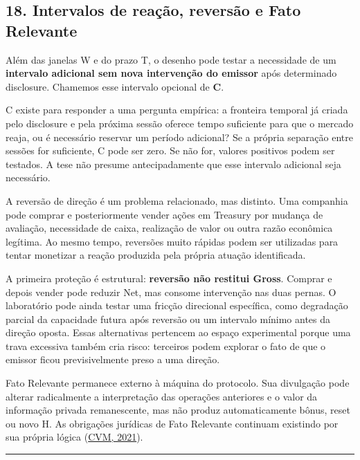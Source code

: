\documentclass[
  a4paper,
]{article}
\begin{document}
\hypertarget{18-cooldown-reversao-e-fato-relevante}{}

\hypertarget{18-intervalos-de-reauxe7uxe3o-reversuxe3o-e-fato-relevante}{%
\subsection{18. Intervalos de reação, reversão e Fato
Relevante}\label{18-intervalos-de-reauxe7uxe3o-reversuxe3o-e-fato-relevante}}

Além das janelas W e do prazo T, o desenho pode testar a necessidade de
um \textbf{intervalo adicional sem nova intervenção do emissor} após
determinado disclosure. Chamemos esse intervalo opcional de \textbf{C}.

C existe para responder a uma pergunta empírica: a fronteira temporal já
criada pelo disclosure e pela próxima sessão oferece tempo suficiente
para que o mercado reaja, ou é necessário reservar um período adicional?
Se a própria separação entre sessões for suficiente, C pode ser zero. Se
não for, valores positivos podem ser testados. A tese não presume
antecipadamente que esse intervalo adicional seja necessário.

A reversão de direção é um problema relacionado, mas distinto. Uma
companhia pode comprar e posteriormente vender ações em Treasury por
mudança de avaliação, necessidade de caixa, realização de valor ou outra
razão econômica legítima. Ao mesmo tempo, reversões muito rápidas podem
ser utilizadas para tentar monetizar a reação produzida pela própria
atuação identificada.

A primeira proteção é estrutural: \textbf{reversão não restitui Gross}.
Comprar e depois vender pode reduzir Net, mas consome intervenção nas
duas pernas. O laboratório pode ainda testar uma fricção direcional
específica, como degradação parcial da capacidade futura após reversão
ou um intervalo mínimo antes da direção oposta. Essas alternativas
pertencem ao espaço experimental porque uma trava excessiva também cria
risco: terceiros podem explorar o fato de que o emissor ficou
previsivelmente preso a uma direção.

Fato Relevante permanece externo à máquina do protocolo. Sua divulgação
pode alterar radicalmente a interpretação das operações anteriores e o
valor da informação privada remanescente, mas não produz automaticamente
bônus, reset ou novo H. As obrigações jurídicas de Fato Relevante
continuam existindo por sua própria lógica
(\protect\hyperlink{ref-2}{CVM, 2021}).

\begin{center}\rule{0.5\linewidth}{0.5pt}\end{center}
\end{document}
